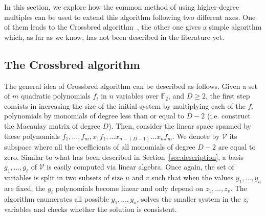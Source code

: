 \documentclass[a4paper,UKenglish,cleveref, autoref]{lipics-v2019}
\begin{document}
In this section, we explore how the common method of using higher-degree multiples can be used to extend this algorithm following two different axes.
%
One of them leads to the \textsf{Crossbred} algorithm~\cite{JouxV17}, the other
one gives a simple algorithm which, as far as we know, has not been described
in the literature yet.



\subsection{The \textsf{Crossbred} algorithm}\label{sec:JV}

The general idea of \textsf{Crossbred} algorithm can be described as follows.
Given a set of $m$ quadratic polynomials $f_i$ in $n$ variables over $\mathbb{F}_2$, 
and $D \geq 2$, the first step consists in
increasing the size of the initial system by multiplying each of the $f_i$
polynomials by monomials of degree less than or equal to $D-2$ 
(i.e. construct the Macaulay matrix of degree $D$).
Then, consider the linear space spanned 
by these polynomials $f_1, \dots, f_m, x_1f_1, \dots x_{n-(D-1)}\dots x_{n}f_m$. 
We denote by $\mathcal{V}$ its subspace where all the coefficients of all 
monomials of degree $D -2$ are equal to zero. Similar to what has been 
described in Section~\ref{sec:description}, a basis $g_1, \dots, g_\ell$ of
$\mathcal{V}$ is easily computed via linear algebra. Once again, the set of variables
is split in two subsets of size $u$ and $v$ such that when the values $y_1, \dots, y_u$
are fixed, the $g_i$ polynomials become linear and only depend on $z_1, \dots, z_v$.
The algorithm enumerates all possible $y_1, \dots, y_u$, solves the smaller system in the $z_i$
variables and checks whether the solution is consistent.
\end{document}
